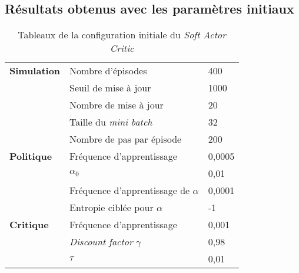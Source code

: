 \subsection{Résultats obtenus avec les paramètres initiaux}

\begin{table}[H]
        \centering
        \begin{tabular}{@{}l l l@{}}
            \toprule
            \textbf{Simulation} & Nombre d'épisodes & 400 \\
            & Seuil de mise à jour & 1000 \\
            & Nombre de mise à jour & 20 \\
            & Taille du \emph{mini batch} & 32 \\
            & Nombre de pas par épisode & 200 \\ \midrule
            \textbf{Politique} & Fréquence d'apprentissage & 0,0005\\
            & $\alpha_{0}$ & 0,01\\
            & Fréquence d'apprentissage de $\alpha$ & 0,0001\\
            & Entropie ciblée pour $\alpha$ & -1\\ \midrule
            \textbf{Critique} & Fréquence d'apprentissage & 0,001\\
            & \emph{Discount factor} $\gamma$ & 0,98\\
            & $\tau$ & 0,01\\
            \bottomrule
        \end{tabular}
    \caption{Tableaux de la configuration initiale du \emph{Soft Actor Critic}}\label{tab:sac:initial_settings}
\end{table}